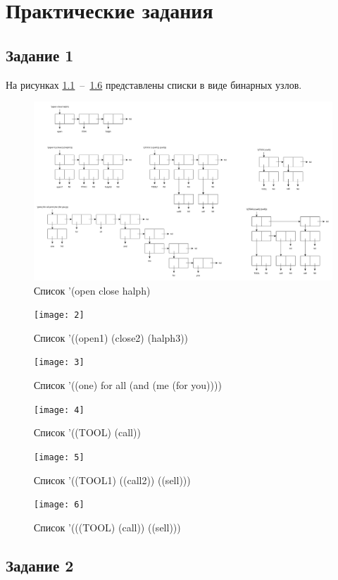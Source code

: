 \chapter{Практические задания}

\section{Задание 1}

На рисунках \ref{1_1}~--~\ref{1_6} представлены списки в виде бинарных узлов.

\begin{figure}[H]
	\centering
	\includegraphics[width=0.8\linewidth]{1}
	\caption{Список '(open close halph)}
	\label{1_1}
\end{figure}
\begin{figure}[H]
	\centering
	\texttt{[image: 2]}
	\caption{Список '((open1) (close2) (halph3))}
	\label{1_2}
\end{figure}
\begin{figure}[H]
	\centering
	\texttt{[image: 3]}
	\caption{Список '((one) for all (and (me (for you)))) }
	\label{1_3}
\end{figure}
\begin{figure}[H]
	\centering
	\texttt{[image: 4]}
	\caption{Список '((TOOL) (call))}
	\label{1_4}
\end{figure}
\begin{figure}[H]
	\centering
	\texttt{[image: 5]}
	\caption{Список '((TOOL1) ((call2)) ((sell)))}
	\label{1_5}
\end{figure}
\begin{figure}[H]
	\centering
	\texttt{[image: 6]}
	\caption{Список '(((TOOL) (call)) ((sell)))}
	\label{1_6}
\end{figure}

\clearpage

\section{Задание 2}

